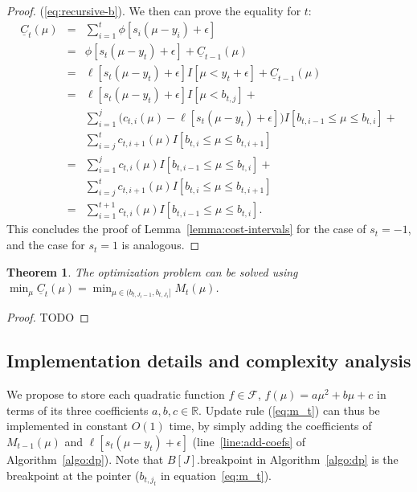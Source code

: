 \documentclass{article}
\newtheorem{theorem}{Theorem}
\begin{document}
\begin{proof}
(\ref{eq:recursive-b}). We then can prove the equality for $t$:
\begin{eqnarray}
\underline C_t(\mu)
&=& \sum_{i=1}^t \phi[s_i(\mu-y_i)+\epsilon]\\
&=& \phi[s_t(\mu-y_t)+\epsilon] + \underline C_{t-1}(\mu)\\
&=& \ell[s_t(\mu-y_t)+\epsilon] I[\mu<y_t+\epsilon]+\underline C_{t-1}(\mu)\\
&=& \ell[s_t(\mu-y_t)+\epsilon] I[\mu<b_{t,j}]+\nonumber\\
 &&\sum_{i=1}^{j} \big(c_{t,i}(\mu)-\ell[s_t(\mu-y_t)+\epsilon]\big)I[b_{t,i-1}\leq\mu\leq b_{t,i}]+\nonumber\\
      &&\sum_{i=j}^{t} c_{t,i+1}(\mu)I[b_{t,i}\leq \mu\leq b_{t,i+1}]\\
 &=&\sum_{i=1}^{j} c_{t,i}(\mu)I[b_{t,i-1}\leq\mu\leq b_{t,i}]+\nonumber\\
      &&\sum_{i=j}^{t} c_{t,i+1}(\mu)I[b_{t,i}\leq \mu\leq b_{t,i+1}]\\
 &=&\sum_{i=1}^{t+1} c_{t,i}(\mu)I[b_{t,i-1}\leq\mu\leq b_{t,i}].
\end{eqnarray}
This concludes the proof of Lemma~\ref{lemma:cost-intervals} for the
case of $s_t=-1$, and the case for $s_t=1$ is analogous.
\end{proof}

\begin{theorem}
  The optimization problem can be solved using
  $\min_\mu\underline
  C_t(\mu)=\min_{\mu\in(b_{t,J_t-1},b_{t,J_t}]}M_t(\mu)$.
\end{theorem}

\begin{proof}
  TODO
\end{proof}

\subsection{Implementation details and complexity analysis}

We propose to store each quadratic function $f\in\mathcal F$,
$f(\mu)=a\mu^2 + b\mu + c$ in terms of its three coefficients
$a,b,c\in\mathbb R$. Update rule (\ref{eq:m_t}) can thus be
implemented in constant $O(1)$ time, by simply adding the coefficients of
$M_{t-1}(\mu)$ and $\ell[s_t(\mu-y_t)+\epsilon]$
(line~\ref{line:add-coefs} of Algorithm~\ref{algo:dp}). Note that
$B[J].\text{breakpoint}$ in Algorithm~\ref{algo:dp} is the 
breakpoint at the pointer ($b_{t,j_t}$ in equation~\ref{eq:m_t}).
\end{document}
